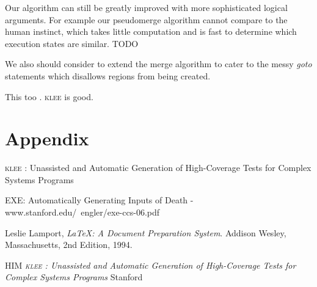 \documentclass[12pt,a4paper]{article}
\newcommand{\klee}{\textsc{klee }}
\begin{document}
Our algorithm can still be greatly improved with more sophisticated logical arguments. For example our pseudomerge algorithm cannot compare to the human instinct, which takes little computation and is fast to determine which execution states are similar. TODO

We also should consider to extend the merge algorithm to cater to the messy \emph{goto} statements which disallows regions from being created. 

\cite{lamport94}

This too \cite{boom}. \klee is good.

\section{Appendix}
\klee: Unassisted and Automatic Generation of High-Coverage Tests for Complex Systems Programs

%
%
EXE: Automatically Generating Inputs of Death - www.stanford.edu/~engler/exe-ccs-06.pdf

\begin{thebibliography}{9}

         Leslie Lamport,
          \emph{\LaTeX: A Document Preparation System}.
	  Addison Wesley, Massachusetts,
	  2nd Edition,
	  1994.

         HIM
         \emph{\klee: Unassisted and Automatic Generation of High-Coverage Tests for Complex Systems Programs}
         Stanford
\end{thebibliography}
\end{document}
